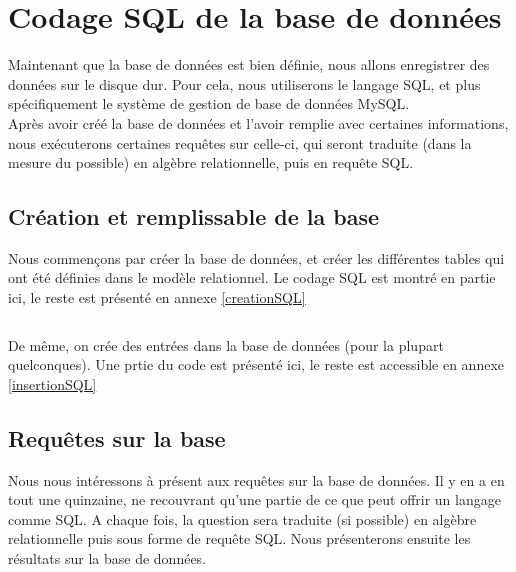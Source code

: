 \section{Codage SQL de la base de données}
Maintenant que la base de données est bien définie, nous allons enregistrer des données sur le disque dur. Pour cela, nous utiliserons le langage SQL, et plus spécifiquement le système de gestion de base de données MySQL.\\
Après avoir créé la base de données et l'avoir remplie avec certaines informations, nous exécuterons certaines requêtes sur celle-ci, qui seront traduite (dans la mesure du possible) en algèbre relationnelle, puis en requête SQL.

\subsection{Création et remplissable de la base}
Nous commençons par créer la base de données, et créer les différentes tables qui ont été définies dans le modèle relationnel. Le codage SQL est montré en partie ici, le reste est présenté en annexe \ref{creationSQL}
\inputminted[frame=leftline, lastline=37]{sql}{../SQL/creationBase.sql}

De même, on crée des entrées dans la base de données (pour la plupart quelconques). Une prtie du code est présenté ici, le reste est accessible en annexe \ref{insertionSQL}
%

\subsection{Requêtes sur la base}
Nous nous intéressons à présent aux requêtes sur la base de données. Il y en a en tout une quinzaine, ne recouvrant qu'une partie de ce que peut offrir un langage comme SQL. A chaque fois, la question sera traduite (si possible) en algèbre relationnelle puis sous forme de requête SQL. Nous présenterons ensuite les résultats sur la base de données.

